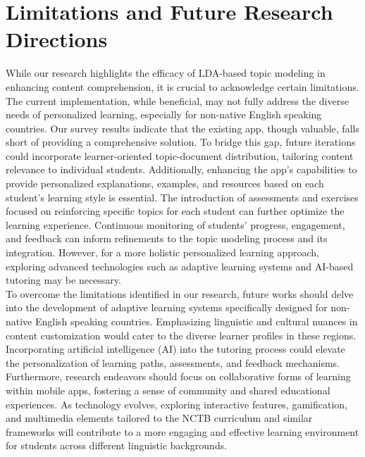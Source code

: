 \documentclass[sn-mathphys,Numbered]{sn-jnl}%
\theoremstyle{thmstyleone}%
\theoremstyle{thmstyletwo}%
\theoremstyle{thmstylethree}%
\begin{document}

\section{Limitations and Future Research Directions}\label{limitat}

While our research highlights the efficacy of LDA-based topic modeling in enhancing content comprehension, it is crucial to acknowledge certain limitations. The current implementation, while beneficial, may not fully address the diverse needs of personalized learning, especially for non-native English speaking countries. Our survey results indicate that the existing app, though valuable, falls short of providing a comprehensive solution. To bridge this gap, future iterations could incorporate learner-oriented topic-document distribution, tailoring content relevance to individual students. Additionally, enhancing the app's capabilities to provide personalized explanations, examples, and resources based on each student's learning style is essential. The introduction of assessments and exercises focused on reinforcing specific topics for each student can further optimize the learning experience. Continuous monitoring of students' progress, engagement, and feedback can inform refinements to the topic modeling process and its integration. However, for a more holistic personalized learning approach, exploring advanced technologies such as adaptive learning systems and AI-based tutoring may be necessary.\\

To overcome the limitations identified in our research, future works should delve into the development of adaptive learning systems specifically designed for non-native English speaking countries. Emphasizing linguistic and cultural nuances in content customization would cater to the diverse learner profiles in these regions. Incorporating artificial intelligence (AI) into the tutoring process could elevate the personalization of learning paths, assessments, and feedback mechanisms. Furthermore, research endeavors should focus on collaborative forms of learning within mobile apps, fostering a sense of community and shared educational experiences. As technology evolves, exploring interactive features, gamification, and multimedia elements tailored to the NCTB curriculum and similar frameworks will contribute to a more engaging and effective learning environment for students across different linguistic backgrounds.\\
\end{document}
